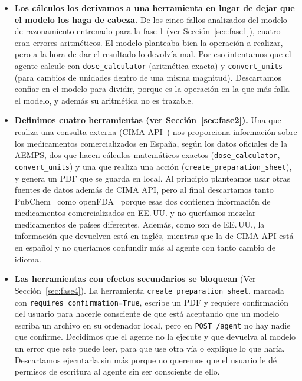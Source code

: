 \begin{itemize}
  \item \textbf{Los cálculos los derivamos a una herramienta en lugar de dejar que el modelo los haga de cabeza.} De los cinco fallos analizados del modelo de razonamiento entrenado para la fase 1 (ver Sección~\ref{sec:fase1}), cuatro eran errores aritméticos. El modelo planteaba bien la operación a realizar, pero a la hora de dar el resultado lo devolvía mal. Por eso intentamos que el agente calcule con \texttt{dose\_\allowbreak{}calculator} (aritmética exacta) y \texttt{convert\_\allowbreak{}units} (para cambios de unidades dentro de una misma magnitud). Descartamos confiar en el modelo para dividir, porque es la operación en la que más falla el modelo, y además su aritmética no es trazable.

  \item \textbf{Definimos cuatro herramientas (ver Sección~\ref{sec:fase2}).} Una que realiza una consulta externa (CIMA API~\cite{cima}) nos proporciona información sobre los medicamentos comercializados en España, según los datos oficiales de la AEMPS, dos que hacen cálculos matemáticos exactos (\texttt{dose\_\allowbreak{}calculator}, \texttt{convert\_\allowbreak{}units}) y una que realiza una acción (\texttt{create\_\allowbreak{}preparation\_\allowbreak{}sheet}), y genera un PDF que se guarda en local. Al principio planteamos usar otras fuentes de datos además de CIMA API, pero al final descartamos tanto PubChem~\cite{pubchem} como openFDA~\cite{openfda} porque esas dos contienen información de medicamentos comercializados en EE.\,UU. y no queríamos mezclar medicamentos de países diferentes. Además, como son de EE.\,UU., la información que devuelven está en inglés, mientras que la de CIMA API está en español y no queríamos confundir más al agente con tanto cambio de idioma.

  \item \textbf{Las herramientas con efectos secundarios se bloquean} (Ver Sección~\ref{sec:fase4}). La herramienta \texttt{create\_\allowbreak{}preparation\_\allowbreak{}sheet}, marcada con \texttt{requires\_\allowbreak{}confirmation=True}, escribe un PDF y requiere confirmación del usuario para hacerle consciente de que está aceptando que un modelo escriba un archivo en su ordenador local, pero en \texttt{POST /agent} no hay nadie que confirme. Decidimos que el agente no la ejecute y que devuelva al modelo un error que este puede leer, para que use otra vía o explique lo que haría. Descartamos ejecutarla sin más porque no queremos que el usuario le dé permisos de escritura al agente sin ser consciente de ello.
\end{itemize}
